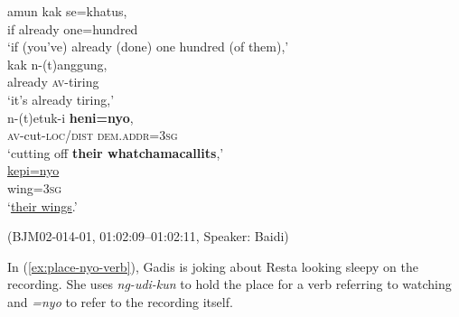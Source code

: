 \documentclass[output=paper,colorlinks,citecolor=brown
\ChapterDOI{10.5281/zenodo.15697585}
]{langscibook}
\begin{document}
\begin{exe}
    \ex\label{ex:place-nyo-nom} \begin{xlist}[0\quad →A:]
         \gll
        amun kak se=khatus, \\
        if already one=hundred \\
        \glt `if (you've) already (done) one hundred (of them),' \\
        \exi{2\quad \hphantom{→B:}} \gll
        kak n-(t)anggung, \\
        already \textsc{av}-tiring \\
        \glt `it's already tiring,' \\
         \gll
        n-(t)etuk-i \textbf{heni=nyo}, \\
        \textsc{av}-cut-\textsc{loc/dist} \textsc{dem.addr}=3\textsc{sg} \\
        \glt `cutting off \textbf{their whatchamacallits},' \\
        \exi{4\quad \hphantom{→B:}} \gll
        \uline{kepi=nyo} \\
        wing=3\textsc{sg} \\
        \glt `\uline{their wings}.' \\
    \end{xlist}
    \hfill (BJM02-014-01, 01:02:09–01:02:11, Speaker: Baidi) 
\end{exe}

In (\ref{ex:place-nyo-verb}), Gadis is joking about Resta looking sleepy on the recording. She uses \textit{ng-udi-kun} to hold the place for a verb referring to watching and \textit{=nyo} to refer to the recording itself.
\end{document}
